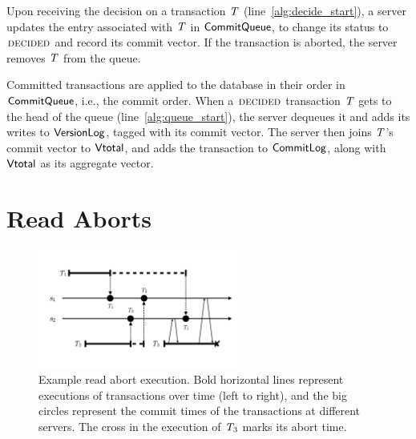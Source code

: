 Upon receiving the decision on a transaction $\mathit{T}$ (line~\ref{alg:decide_start}), a server updates the entry associated with $\mathit{T}$ in $\mathsf{CommitQueue}$, to change its status to $\text{\sc decided}$ and record its commit vector. If the transaction is aborted, the server removes $\mathit{T}$ from the queue.

Committed transactions are applied to the database in their order in $\mathsf{CommitQueue}$, i.e., the commit order. When a $\text{\sc decided}$ transaction $\mathit{T}$ gets to the head of the queue (line~\ref{alg:queue_start}), the server dequeues it and adds its writes to $\mathsf{VersionLog}$, tagged with its commit vector. The server then joins $\mathit{T}$'s commit vector to $\mathsf{Vtotal}$, and adds the transaction to $\mathsf{CommitLog}$, along with $\mathsf{Vtotal}$ as its aggregate vector.

\section{Read Aborts}


\begin{figure}[h]
  \centering
  \vspace{-1cm}
  \includegraphics[width=0.6\textwidth]{figures/ch4_abort_execution.pdf}
  \vspace{-0.5cm}
\caption{Example read abort execution. Bold horizontal lines represent executions of transactions over time (left to right), and the big circles represent the commit times of the transactions at different servers. The cross in the execution of $\mathit{T}_3$ marks its abort time. }
\label{fig:read_abort}
\end{figure}
